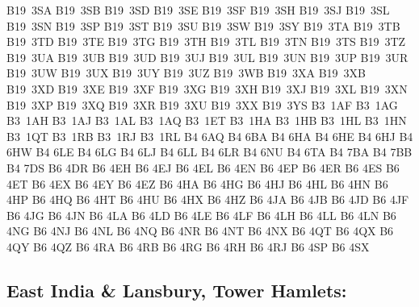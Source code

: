 \documentclass[12pt,a4paper]{article}
\begin{document}
{{B19~3SA	B19~3SB	B19~3SD	B19~3SE	B19~3SF	B19~3SH
B19~3SJ	B19~3SL	B19~3SN	B19~3SP	B19~3ST	B19~3SU
B19~3SW	B19~3SY	B19~3TA	B19~3TB	B19~3TD	B19~3TE
B19~3TG	B19~3TH	B19~3TL	B19~3TN	B19~3TS	B19~3TZ
B19~3UA	B19~3UB	B19~3UD	B19~3UJ	B19~3UL	B19~3UN
B19~3UP	B19~3UR	B19~3UW	B19~3UX	B19~3UY	B19~3UZ
B19~3WB	B19~3XA	B19~3XB	B19~3XD	B19~3XE	B19~3XF
B19~3XG	B19~3XH	B19~3XJ	B19~3XL	B19~3XN	B19~3XP
B19~3XQ	B19~3XR	B19~3XU	B19~3XX	B19~3YS	B3~1AF
B3~1AG	B3~1AH	B3~1AJ	B3~1AL	B3~1AQ	B3~1ET
B3~1HA	B3~1HB	B3~1HL	B3~1HN	B3~1QT	B3~1RB
B3~1RJ	B3~1RL	B4 6AQ	B4 6BA	B4 6HA	B4 6HE
B4 6HJ	B4 6HW	B4 6LE	B4 6LG	B4 6LJ	B4 6LL
B4 6LR	B4 6NU	B4 6TA	B4 7BA	B4 7BB	B4 7DS
B6 4DR	B6 4EH	B6 4EJ	B6 4EL	B6 4EN	B6 4EP
B6 4ER	B6 4ES	B6 4ET	B6 4EX	B6 4EY	B6 4EZ
B6 4HA	B6 4HG	B6 4HJ	B6 4HL	B6 4HN	B6 4HP
B6 4HQ	B6 4HT	B6 4HU	B6 4HX	B6 4HZ	B6 4JA
B6 4JB	B6 4JD	B6 4JF	B6 4JG	B6 4JN	B6 4LA
B6 4LD	B6 4LE	B6 4LF	B6 4LH	B6 4LL	B6 4LN
B6 4NG	B6 4NJ	B6 4NL	B6 4NQ	B6 4NR	B6 4NT
B6 4NX	B6 4QT	B6 4QX	B6 4QY	B6 4QZ	B6 4RA
B6 4RB	B6 4RG	B6 4RH	B6 4RJ	B6 4SP	B6 4SX
}}

\subsection*{East India \& Lansbury, Tower Hamlets:}
\end{document}
